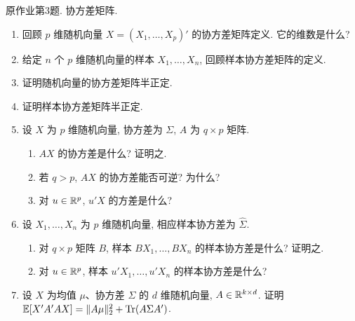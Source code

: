 \begin{exercise}\label{ps10:p03}
原作业第3题. 协方差矩阵.
\begin{enumerate}[label=\arabic*.]
\item 回顾 $p$ 维随机向量 $X=(X_1,\ldots,X_p)'$ 的协方差矩阵定义. 它的维数是什么?
\item 给定 $n$ 个 $p$ 维随机向量的样本 $X_1,\ldots,X_n$, 回顾样本协方差矩阵的定义.
\item 证明随机向量的协方差矩阵半正定.
\item 证明样本协方差矩阵半正定.
\item 设 $X$ 为 $p$ 维随机向量, 协方差为 $\Sigma$, $A$ 为 $q\times p$ 矩阵.
\begin{enumerate}[label=\alph*)]
\item $AX$ 的协方差是什么? 证明之.
\item 若 $q>p$, $AX$ 的协方差能否可逆? 为什么?
\item 对 $u\in\mathbb R^p$, $u'X$ 的方差是什么?
\end{enumerate}
\item 设 $X_1,\ldots,X_n$ 为 $p$ 维随机向量, 相应样本协方差为 $\widehat\Sigma$.
\begin{enumerate}[label=\alph*)]
\item 对 $q\times p$ 矩阵 $B$, 样本 $BX_1,\ldots,BX_n$ 的样本协方差是什么? 证明之.
\item 对 $u\in\mathbb R^p$, 样本 $u'X_1,\ldots,u'X_n$ 的样本协方差是什么?
\end{enumerate}
\item 设 $X$ 为均值 $\mu$、协方差 $\Sigma$ 的 $d$ 维随机向量, $A\in\mathbb R^{k\times d}$. 证明 $\mathbb E[X'A'AX]=\lVert A\mu\rVert_2^2+\operatorname{Tr}(A\Sigma A')$.
\end{enumerate}
\end{exercise}

